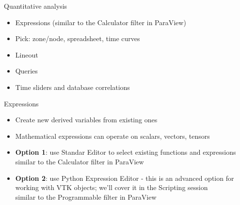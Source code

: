 \begin{comment}
  http://www.vtk.org/download - Download VTK textbook examples and data - PineRoot.tgz
  http://www.vtk.org/files/release/7.0/VTKLargeData-7.0.0.zip


  Cross-mesh field evaluation (CMFE) and database comparison
  \url{http://www.visitusers.org/index.php?title=Cmfe_overview}
  \url{http://www.visitusers.org/index.php?title=Cross_Mesh_Field_Evaluation}
  The CMFE expressions evaluate a field from a donor mesh onto a target mesh to form a new field.

  Data level comparison wizard
    \url{http://www.visitusers.org/index.php?title=VisIt-tutorial-comparison}

    
\end{comment}

\begin{frame}{Quantitative analysis}{}
  \begin{itemize}\setlength{\itemsep}{3mm}
  \item Expressions (similar to the Calculator filter in ParaView)
  \item Pick: zone/node, spreadsheet, time curves
  \item Lineout
  \item Queries
  \item Time sliders and database correlations
  \end{itemize}
\end{frame}

\begin{frame}{Expressions}
  \begin{itemize}\setlength{\itemsep}{3mm}
  \item Create new derived variables from existing ones
  \item Mathematical expressions can operate on scalars, vectors, tensors
  \item {\bf Option 1}: use Standar Editor to select existing functions and expressions \\
    similar to the Calculator filter in ParaView
  \item {\bf Option 2}: use Python Expression Editor - this is an advanced option for working
    with VTK objects; we'll cover it in the Scripting session \\ similar to the Programmable
    filter in ParaView
  \end{itemize}
\end{frame}

